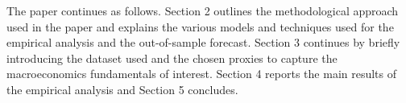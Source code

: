 The paper continues as follows. Section 2 outlines the methodological approach used in the paper and explains the various models and techniques used for
the empirical analysis and the out-of-sample forecast. Section 3 continues by briefly introducing the dataset used and the chosen proxies to capture the
macroeconomics fundamentals of interest. Section 4 reports the main results of the empirical analysis and Section 5 concludes.